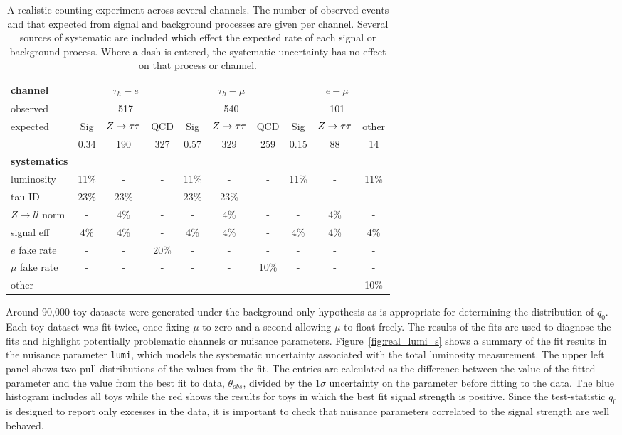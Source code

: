 \begin{table}
\centering
\begin{tabular}{|l|c|c|c|c|c|c|c|c|c|}
\hline
\textbf{channel} & \multicolumn{3}{c|}{$\tau_{h}-e$} & \multicolumn{3}{|c|}{$\tau_{h}-\mu$} 
&\multicolumn{3}{c|}{$e-\mu$}   	\\ \hline
observed & \multicolumn{3}{c}{517} &\multicolumn{3}{|c|}{540} & \multicolumn{3}{c|}{101} \\ \hline
expected & Sig & $Z\rightarrow\tau\tau$ & QCD & Sig & $Z\rightarrow\tau\tau$ & QCD &Sig & $Z\rightarrow\tau\tau$ & other 		\\ \hline
	 & 0.34 & 190 & 327 &  0.57 & 329 & 259 & 0.15 & 88 & 14			\\ \hline
\hline
\textbf{systematics} & \multicolumn{9}{c|}{} \\ \hline
luminosity	 & 11\% & - & - & 11\% & - & - & 11\% & - & 11\% 	\\ \hline 
tau ID	 & 23\% & 23\% & - & 23\% & 23\% & - & - & - & -  	\\ \hline 
$Z\rightarrow ll$ norm    & - & 4\% & - & - & 4\% & - & - & 4\% & - 		\\ \hline
signal eff    & 4\% & 4\%&  - & 4\% & 4\% & - & 4\% & 4\% & 4\%	\\ \hline  
$e$ fake rate	 & - & - & 20\% & - & - & - & - & - & - 		\\ \hline
$\mu$ fake rate    & - & - & - & - & - & 10\% & - & - & -			\\ \hline
other  & - & - & - & - & - & - & - & - & 10\%			\\ \hline
\end{tabular}
\caption{A realistic counting experiment across several channels. 
The number of observed events and that expected from signal and background
processes are given per channel. Several sources of systematic are included 
which effect the expected rate of each signal or background process. 
Where a dash is entered, the systematic uncertainty has no effect on that 
process or channel. \label{tab:realanalysis}}
\end{table}

Around 90,000 toy datasets were generated under the background-only hypothesis as is 
appropriate for determining the distribution of $q_{0}$. 
Each toy dataset was fit twice, once fixing $\mu$ to zero and a second allowing $\mu$ to float freely.
The results of the fits are used to diagnose the fits and highlight 
potentially problematic channels or nuisance parameters. 
Figure~\ref{fig:real_lumi_s} shows a summary of the fit results 
in the nuisance parameter \texttt{lumi}, 
which models the systematic uncertainty associated with the total luminosity measurement.
The upper left panel shows two pull distributions of the values from the fit. The entries are
calculated as the difference between the value of the fitted parameter
and the value from the best fit to data, $\theta_{obs}$, divided by 
the $1\sigma$ uncertainty on the parameter before fitting to the data. 
The blue histogram includes all toys while the red shows the results
for toys in which the best fit signal strength is positive. Since the test-statistic $q_{0}$ 
is designed to report only excesses in the data,
it is important to check that nuisance parameters correlated to the signal 
strength are well behaved.

